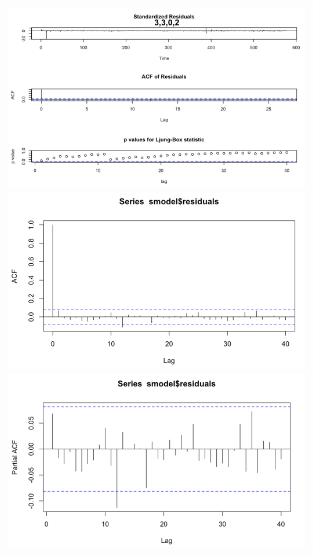\documentclass[a4paper,11pt]{article}
\begin{document}
    \newpage
    \begin{figure}[H]
        \centering
        \includegraphics[width=0.7\textwidth]{figure-markdown_strict/3-3-0-2.png}
        \includegraphics[width=0.7\textwidth]{figure-markdown_strict/3-3-0-2.1.png}
        \includegraphics[width=0.7\textwidth]{figure-markdown_strict/3-3-0-2.2.png}
        \label{fig:f9}
    \end{figure}
\end{document}
